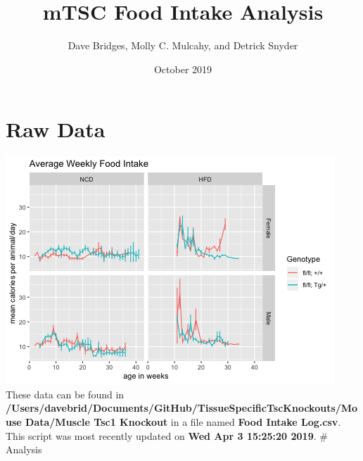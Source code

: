 \documentclass[]{article}
\title{mTSC Food Intake Analysis}
\author{Dave Bridges, Molly C. Mulcahy, and Detrick Snyder}
\date{October 2019}
\begin{document}
\maketitle

{
\setcounter{tocdepth}{2}
\tableofcontents
}
\section{Raw Data}\label{raw-data}

\includegraphics{figures/intake-graphs-1.png} These data can be found in
\textbf{/Users/davebrid/Documents/GitHub/TissueSpecificTscKnockouts/Mouse
Data/Muscle Tsc1 Knockout} in a file named \textbf{Food Intake Log.csv}.
This script was most recently updated on \textbf{Wed Apr 3 15:25:20
2019}. \# Analysis
\end{document}
